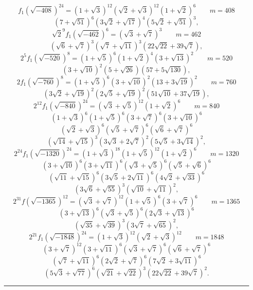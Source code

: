 
\[
f_1(\sqrt{-408})^{24} = (1+\sqrt3)^{12}(\sqrt2+\sqrt3)^{12}(1+\sqrt2)^6 \qquad m = 408
\]
\[
(7+\sqrt{51})^6(3\sqrt2+\sqrt{17})^4(5\sqrt2+\sqrt{51})^3,
\]
\[
\sqrt2^{9} f_1(\sqrt{-462})^6 = (\sqrt3+\sqrt7)^3 \qquad m = 462
\]
\[
(\sqrt6+\sqrt7)^3(\sqrt7+\sqrt{11})^3(22\sqrt{22}+39\sqrt7),
\]
\[
2^5 f_1(\sqrt{-520})^8 = (1+\sqrt5)^6(1+\sqrt2)^4(3+\sqrt{13})^2 \qquad m = 520
\]
\[
(3+\sqrt{10})^2(5+\sqrt{26})(57+5\sqrt{130}),
\]
\[
2 f_1(\sqrt{-760})^8 = (1+\sqrt5)^6(3+\sqrt{10})^2(13+3\sqrt{19})^2 \qquad m = 760
\]
\[
(3\sqrt2+\sqrt{19})^2(2\sqrt5+\sqrt{19})^2(51\sqrt{10}+37\sqrt{19}),
\]
\[
2^{12} f_1(\sqrt{-840})^{24} = (\sqrt3+\sqrt5)^{12}(1+\sqrt2)^6 \qquad m = 840
\]
\[
(1+\sqrt3)^6(1+\sqrt5)^6(3+\sqrt7)^6(3+\sqrt{10})^6
\]
\[
(\sqrt2+\sqrt3)^6(\sqrt5+\sqrt7)^6(\sqrt6+\sqrt7)^6
\]
\[
(\sqrt{14}+\sqrt{15})^3(3\sqrt3+2\sqrt7)^2(5\sqrt5+3\sqrt{14})^2,
\]
\[
2^{24} f_1(\sqrt{-1320})^{24} = (1+\sqrt3)^{18}(1+\sqrt5)^{12}(1+\sqrt2)^6 \qquad m = 1320
\]
\[
(3+\sqrt{10})^6(3+\sqrt{11})^6(\sqrt3+\sqrt5)^6(\sqrt5+\sqrt6)^6
\]
\[
(\sqrt{11}+\sqrt{15})^6(3\sqrt5+2\sqrt{11})^6(4\sqrt2+\sqrt{33})^6
\]
\[
(3\sqrt6+\sqrt{55})^3(\sqrt{10}+\sqrt{11})^2,
\]
\[
2^{31} f(\sqrt{-1365})^{12} = (\sqrt3+\sqrt7)^{12}(1+\sqrt5)^6(3+\sqrt7)^6 \qquad m = 1365
\]
\[
(3+\sqrt{13})^6(\sqrt3+\sqrt5)^6(2\sqrt3+\sqrt{13})^6
\]
\[
(\sqrt{35}+\sqrt{39})^3(3\sqrt7+\sqrt{65})^2,
\]
\[
2^{21} f_1(\sqrt{-1848})^{24} = (1+\sqrt3)^{12}(\sqrt2+\sqrt3)^{12} \qquad m = 1848
\]
\[
(3+\sqrt7)^{12}(3+\sqrt{11})^6(\sqrt3+\sqrt7)^6(\sqrt6+\sqrt7)^6
\]
\[
(\sqrt7+\sqrt{11})^6(2\sqrt2+\sqrt7)^6(7\sqrt2+3\sqrt{11})^6
\]
\[
(5\sqrt3+\sqrt{77})^6(\sqrt{21}+\sqrt{22})^3(22\sqrt{22}+39\sqrt7)^2.
\]

\begin{center}
\rule{4cm}{0.4pt}
\end{center}
